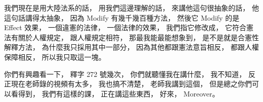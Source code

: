 \hypertarget{w06:cue:527}{}我們現在是用大陸法系的話，
\hypertarget{w06:cue:528}{}用我們這邊理解的話，
\hypertarget{w06:cue:529}{}來講他這句很抽象的話，
\hypertarget{w06:cue:530}{}他這句話講得太抽象，
\hypertarget{w06:cue:531}{}因為 Modify 有幾千幾百種方法，
\hypertarget{w06:cue:532}{}然後它 Modify 的是 Effect 效果，
\hypertarget{w06:cue:533}{}一個違憲的法律，
\hypertarget{w06:cue:534}{}一個法律的效果，
\hypertarget{w06:cue:535}{}我們指它修改成，
\hypertarget{w06:cue:536}{}它符合憲法有關於人權規定，
\hypertarget{w06:cue:537}{}跟人權規定相符，
\hypertarget{w06:cue:538}{}那最我能最能想象到，
\hypertarget{w06:cue:539}{}是不是就是合憲性解釋方法，
\hypertarget{w06:cue:540}{}為什麼我只採用其中一部分，
\hypertarget{w06:cue:541}{}因為其他都跟憲法意旨相反，
\hypertarget{w06:cue:542}{}都跟人權保障相反，
\hypertarget{w06:cue:543}{}所以我只取這一塊。

\hypertarget{w06:cue:544}{}你們有興趣看一下，
\hypertarget{w06:cue:545}{}釋字 272 號幾次，
\hypertarget{w06:cue:546}{}你們就聽懂我在講什麼，
\hypertarget{w06:cue:547}{}我不知道，
\hypertarget{w06:cue:548}{}反正現在老師錄的視頻有太多，
\hypertarget{w06:cue:549}{}我也搞不清楚，
\hypertarget{w06:cue:550}{}老師我講到這個，
\hypertarget{w06:cue:551}{}但是總之你們可以看得到，
\hypertarget{w06:cue:552}{}我們有這樣的課，
\hypertarget{w06:cue:553}{}正在講這些東西，
\hypertarget{w06:cue:554}{}好來，
\hypertarget{w06:cue:555}{}Moreover。

